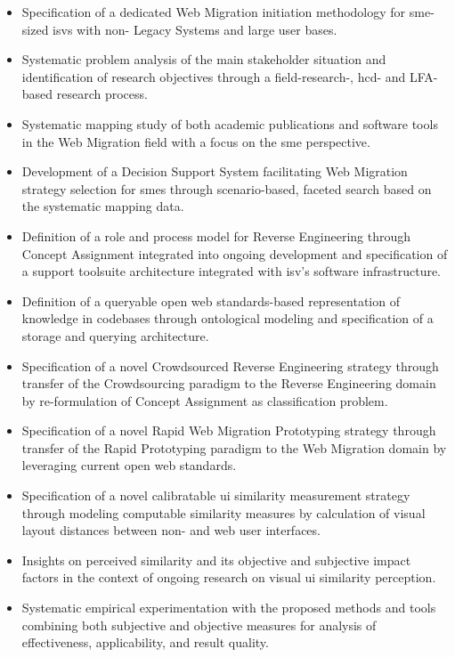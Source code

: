 \begin{itemize}
\tightlist
\item
  Specification of a dedicated \gls{Web Migration} initiation methodology for \gls{sme}-sized \glspl{isv} with non- \glspl{Legacy System} and large user bases.
\item
  Systematic problem analysis of the main stakeholder situation and identification of research objectives through a field-research-, \gls{hcd}- and LFA-based research process.
\item
  Systematic mapping study of both academic publications and software tools in the \gls{Web Migration} field with a focus on the \gls{sme} perspective.
\item
  Development of a Decision Support System facilitating \gls{Web Migration} strategy selection for \glspl{sme} through scenario-based, faceted search based on the systematic mapping data.
\item
  Definition of a role and process model for \gls{Reverse Engineering} through \gls{Concept Assignment} integrated into ongoing development and specification of a support toolsuite architecture integrated with \gls{isv}'s software infrastructure.
\item
  Definition of a queryable open \gls{web} standards-based representation of knowledge in  codebases through ontological modeling and specification of a storage and querying \knowledgebase architecture.
\item
  Specification of a novel Crowdsourced \gls{Reverse Engineering} strategy through transfer of the \gls{Crowdsourcing} paradigm to the \gls{Reverse Engineering} domain by re-formulation of \gls{Concept Assignment} as classification problem.
\item
  Specification of a novel \gls{Rapid Web Migration Prototyping} strategy through transfer of the \gls{Rapid Prototyping} paradigm to the \gls{Web Migration} domain by leveraging current open \gls{web} standards.
\item
  Specification of a novel calibratable \gls{ui} similarity measurement strategy through modeling computable similarity measures by calculation of visual layout distances between non- and \gls{web} user interfaces.
\item
  Insights on perceived similarity and its objective and subjective impact factors in the context of ongoing research on visual \gls{ui} similarity perception.
\item
  Systematic empirical experimentation with the proposed methods and tools combining both subjective and objective measures for analysis of effectiveness, applicability, and result quality.
\end{itemize}

